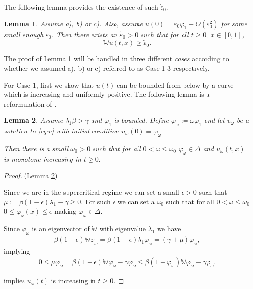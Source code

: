 \documentclass{article}
\newcommand{\W}{\mathbb{W}}
\newcommand{\1}[1]{{\mathds{1}}_{\left\{#1\right\}}}
\newtheorem{lemma}{Lemma}
\begin{document}
The following lemma provides the existence of such $\tilde{\varepsilon}_0.$

\begin{lemma}
\label{l:epsilon_0_tilde}
Assume a), b) or c). Also, assume $u(0)=\varepsilon_0 \varphi_1+O \left(\varepsilon_0^2 \right)$ for some small enough $\varepsilon_0$. Then there exists an $\tilde{\varepsilon}_0>0$ such that for all $t \geq 0, \ x \in [0,1] $,
 $$\W u(t,x) \geq \tilde{\varepsilon}_0.$$
\end{lemma}

The proof of Lemma \ref{l:epsilon_0_tilde} will be handled in three different \emph{cases} according to whether we assumed a), b) or c) referred to as Case 1-3 respectively.

For Case 1, first we show that $u(t)$ can be bounded from below by a curve which is increasing and uniformly positive. The following lemma is a reformulation of \cite[Proposition 4.8.]{SISdyn}.

\begin{lemma}
	\label{l:monotone_lower_bound}
	Assume $\lambda_1 \beta>\gamma$ and $\varphi_1$ is bounded. Define $\varphi_\omega:=\omega \varphi_1$ and let $u_{\omega}$ be a solution to \eqref{eq:u} with initial condition $u_{\omega}(0)=\varphi_\omega.$
	
	Then there is a small $\omega_0>0$ such that for all $0<\omega \leq \omega_0$ $\varphi_\omega\in \Delta$ and $u_{\omega}(t,x)$ is monotone increasing in $t \geq 0.$
\end{lemma}

\begin{proof}(Lemma \ref{l:monotone_lower_bound})
	
	
	Since we are in the supercritical regime we can set a small $\epsilon>0$ such that $\mu:=\beta(1-\epsilon)\lambda_1-\gamma \geq 0.$ For such $\epsilon$ we can set a $\omega_0$ such that for all $0<\omega \leq \omega_0$ $0 \leq \varphi_{\omega}(x) \leq \epsilon$ making $\varphi_{\omega} \in \Delta.$
	
	Since $\varphi_{\omega}$ is an eigenvector of $\W$ with eigenvalue $\lambda_1$ we have
	\begin{align*}
		\beta(1-\epsilon)\W \varphi_{\omega}=\beta(1-\epsilon)\lambda_1 \varphi_{\omega}=(\gamma+\mu)\varphi_{\omega},
	\end{align*}
	implying
	\begin{align*}
		0 \leq \mu \varphi_{\omega}=\beta(1-\epsilon)\W \varphi_{\omega}-\gamma \varphi_{\omega} \leq  \beta(1-\varphi_{\omega})\W \varphi_{\omega}-\gamma \varphi_{\omega}.
	\end{align*}
	
	\cite[Proposition 2.12.]{SISdyn} implies $u_{\omega}(t)$ is increasing in $t \geq 0.$
\end{proof}
\end{document}
